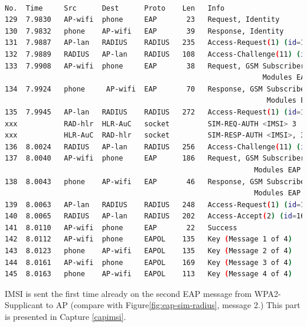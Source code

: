 \documentclass[12pt,a4paper,english]{tutthesis}
\begin{document}
\begin{otherlanguage}{english}

\begin{lstlisting}[language=bash,label=eap-sim-capture,caption={Successful EAP-SIM Authentication}]

No.  Time     Src      Dest      Proto    Len   Info                                  
129  7.9830   AP-wifi  phone     EAP       23   Request, Identity                     
130  7.9832   phone    AP-wifi   EAP       39   Response, Identity                    
131  7.9887   AP-lan   RADIUS    RADIUS   235   Access-Request(1) (id=162, l=193)     
132  7.9889   RADIUS   AP-lan    RADIUS   108   Access-Challenge(11) (id=162, l=66)   
133  7.9908   AP-wifi  phone     EAP       38   Request, GSM Subscriber Identity      
                                                             Modules EAP (EAP-SIM)                 
134  7.9924   phone     AP-wifi  EAP       70   Response, GSM Subscriber Identity     
                                                              Modules EAP (EAP-SIM)                 
135  7.9945   AP-lan   RADIUS    RADIUS   272   Access-Request(1) (id=163, l=230)     
xxx           RAD-hlr  HLR-AuC   socket         SIM-REQ-AUTH <IMSI> 3                 
xxx           HLR-AuC  RAD-hlr   socket         SIM-RESP-AUTH <IMSI>, 3 triplets      
136  8.0024   RADIUS   AP-lan    RADIUS   256   Access-Challenge(11) (id=163, l=214)  
137  8.0040   AP-wifi  phone     EAP      186   Request, GSM Subscriber Identity      
                                                           Modules EAP (EAP-SIM)                 
138  8.0043   phone    AP-wifi   EAP       46   Response, GSM Subscriber Identity     
                                                           Modules EAP (EAP-SIM)                 
139  8.0063   AP-lan   RADIUS    RADIUS   248   Access-Request(1) (id=164, l=206)     
140  8.0065   RADIUS   AP-lan    RADIUS   202   Access-Accept(2) (id=164, l=160)      
141  8.0110   AP-wifi  phone     EAP       22   Success                          
142  8.0112   AP-wifi  phone     EAPOL    135   Key (Message 1 of 4)                  
143  8.0123   phone    AP-wifi   EAPOL    135   Key (Message 2 of 4)                  
144  8.0161   AP-wifi  phone     EAPOL    169   Key (Message 3 of 4)                  
145  8.0163   phone    AP-wifi   EAPOL    113   Key (Message 4 of 4)     
\end{lstlisting}



IMSI is sent the first time already on the second EAP message from 
WPA2-Supplicant to AP (compare with Figure\ref{fig:eap-sim-radius}, message 2.)
This part is presented in Capture \ref{capimsi}.


\end{otherlanguage}
\end{document}
